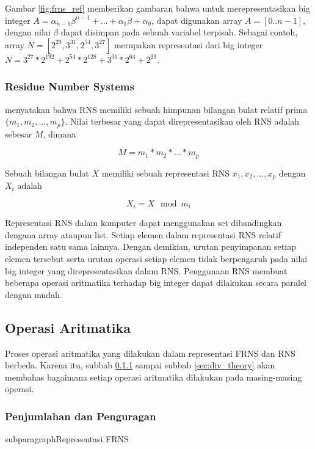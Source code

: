     Gambar \ref{fig:frns_ref} memberikan gambaran bahwa untuk merepresentasikan big integer $A = \alpha_{n-1}\beta^{n-1}+...+\alpha_{1}\beta+\alpha_{0}$, dapat digunakan array $A = [0..n-1]$, dengan nilai $\beta$ dapat disimpan pada sebuah variabel terpisah. Sebagai contoh, array $N = [2^29, 3^31, 2^54, 3^27]$ merupakan representasi dari big integer $N = 3^27*2^192 + 2^54*2^128 + 3^31*2^64 + 2^29$.

    \subsubsection{Residue Number Systems} \label{sec:rns}
    \citet{rns_survey} menyatakan bahwa RNS memiliki sebuah himpunan bilangan bulat relatif prima $\{m_1,m_2,...,m_p\}$. Nilai terbesar yang dapat direpresentasikan oleh RNS adalah sebesar $M$, dimana

    \begin{equation}
      M = m_1 * m_2 * ... * m_p
    \end{equation}

    Sebuah bilangan bulat $X$ memiliki sebuah representasi RNS ${x_1,x_2,...,x_p}$ dengan $X_i$ adalah

    \begin{equation}
      X_i = X \mod m_i
    \end{equation}


    Representasi RNS dalam komputer dapat menggunakan set dibandingkan dengana array ataupun list. Setiap elemen dalam representasi RNS relatif independen satu sama lainnya. Dengan demikian, urutan penyimpanan setiap elemen tersebut serta urutan operasi setiap elemen tidak berpengaruh pada nilai big integer yang direpresentasikan dalam RNS. Penggunaan RNS membuat beberapa operasi aritmatika terhadap big integer dapat dilakukan secara paralel dengan mudah.


  \subsection{Operasi Aritmatika}

    Proses operasi aritmatika yang dilakukan dalam representasi FRNS dan RNS berbeda. Karena itu, subbab \ref{sec:add_sub_theory} sampai subbab \ref{sec:div_theory} akan membahas bagaimana setiap operasi aritmatika dilakukan pada masing-masing operasi.


    \subsubsection{Penjumlahan dan Penguragan} \label{sec:add_sub_theory}
    subparagraph{Representasi FRNS}

